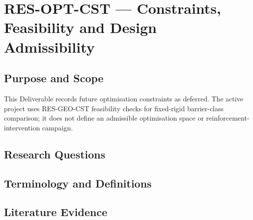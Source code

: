 
\section{RES-OPT-CST --- Constraints, Feasibility and Design Admissibility}
\label{sec:res-opt-cst}

\subsection{Purpose and Scope}
\label{sec:res-opt-cst-purpose}

This Deliverable records future optimisation constraints as deferred.
The active project uses RES-GEO-CST feasibility checks for fixed-rigid
barrier-class comparison; it does not define an admissible
optimisation space or reinforcement-intervention campaign.

\subsection{Research Questions}
\label{sec:res-opt-cst-research-questions}


\subsection{Terminology and Definitions}
\label{sec:res-opt-cst-definitions}


\subsection{Literature Evidence}
\label{sec:res-opt-cst-literature-evidence}

%

